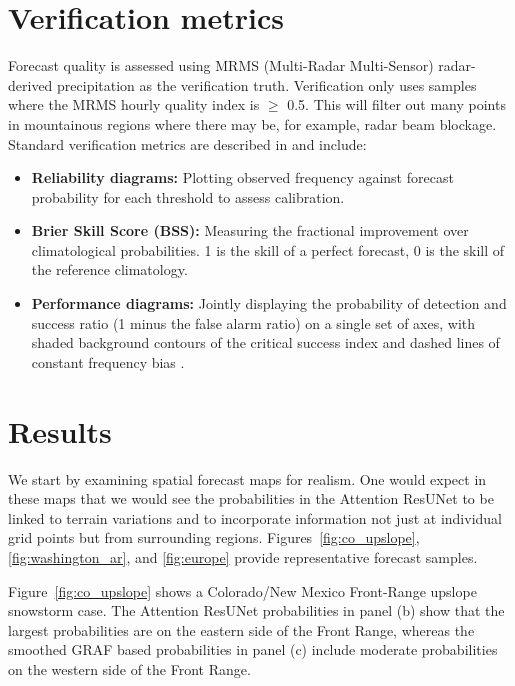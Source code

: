 \documentclass[11pt]{article}
\begin{document}
\section{Verification metrics}
\label{sec:verification}

Forecast quality is assessed using MRMS (Multi-Radar Multi-Sensor)
radar-derived precipitation as the verification truth.  Verification only uses samples where
the MRMS hourly quality index is $\geq$ 0.5.   This will filter out many points in mountainous
regions where there may be, for example, radar beam blockage.  Standard
verification metrics are described in \citet{wilks2011} and include:
\begin{itemize}
  \item \textbf{Reliability diagrams:} Plotting observed frequency
        against forecast probability for each threshold to assess
        calibration.
  \item \textbf{Brier Skill Score (BSS):} Measuring  the fractional improvement
        over climatological probabilities. 1 is the skill of a perfect forecast, 0 is the
        skill of the reference climatology.
  \item \textbf{Performance diagrams:} Jointly displaying the probability of detection
        and success ratio (1 minus the false alarm ratio) on a single set of axes, with
        shaded background contours of the critical success index and dashed lines of
        constant frequency bias \citep{roebber2009}.
\end{itemize}

\section{Results}
\label{sec:results}

We start by examining spatial forecast maps for realism.   One would expect in these maps that
we would see the probabilities in the Attention ResUNet to be linked to terrain variations and
to incorporate information not just at individual grid points but from surrounding regions.
Figures~\ref{fig:co_upslope}, \ref{fig:washington_ar}, and \ref{fig:europe} provide
representative forecast samples.

Figure~\ref{fig:co_upslope} shows a Colorado/New Mexico Front-Range upslope snowstorm case.  The
Attention ResUNet probabilities in panel (b) show that the largest probabilities are on the
eastern side of the Front Range, whereas the smoothed GRAF based probabilities in panel
(c) include moderate probabilities on the western side of the Front Range.
\end{document}
